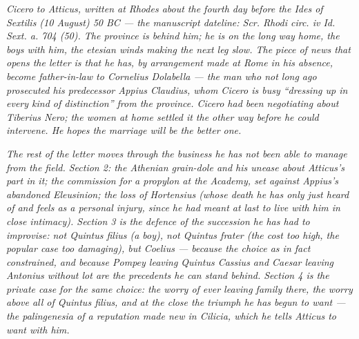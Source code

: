 
\textit{Cicero to Atticus, written at Rhodes about the
fourth day before the Ides of Sextilis (10 August) 50
BC --- the manuscript dateline: \textit{Scr. Rhodi
circ. iv Id. Sext. a. 704 (50)}. The province is
behind him; he is on the long way home, the boys with
him, the etesian winds making the next leg slow. The
piece of news that opens the letter is that he has, by
arrangement made at Rome in his absence, become
father-in-law to Cornelius Dolabella --- the man who
not long ago prosecuted his predecessor Appius
Claudius, whom Cicero is busy ``dressing up in every
kind of distinction'' from the province. Cicero had
been negotiating about Tiberius Nero; the women at
home settled it the other way before he could
intervene. He hopes the marriage will be the better
one.}

\textit{The rest of the letter moves through the
business he has not been able to manage from the
field. Section 2: the Athenian grain-dole and his
unease about Atticus's part in it; the commission for
a propylon at the Academy, set against Appius's
abandoned Eleusinion; the loss of Hortensius (whose
death he has only just heard of and feels as a
personal injury, since he had meant at last to live
with him in close intimacy). Section 3 is the
defence of the succession he has had to improvise:
not Quintus filius (a boy), not Quintus frater
(the cost too high, the popular case too damaging),
but Coelius --- because the choice as in fact
constrained, and because Pompey leaving Quintus
Cassius and Caesar leaving Antonius without lot are
the precedents he can stand behind. Section 4 is
the private case for the same choice: the worry of
ever leaving family there, the worry above all of
Quintus filius, and at the close the triumph he has
begun to want --- the \textit{palingenesia} of a
reputation made new in Cilicia, which he tells Atticus
to want with him.}
